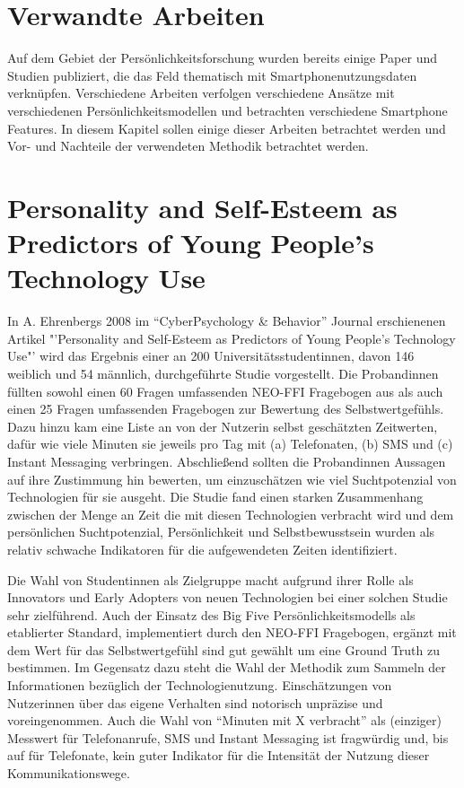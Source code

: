 \section{Verwandte Arbeiten}
\label{ch:Grundlagen:sec:RelatedWork}

Auf dem Gebiet der Persönlichkeitsforschung wurden bereits einige Paper und Studien publiziert,
die das Feld thematisch mit Smartphonenutzungsdaten verknüpfen. 
Verschiedene Arbeiten verfolgen verschiedene Ansätze mit verschiedenen Persönlichkeitsmodellen und betrachten verschiedene Smartphone Features.
In diesem Kapitel sollen einige dieser Arbeiten betrachtet werden und Vor- und Nachteile der verwendeten Methodik betrachtet werden.

\section*{Personality and Self-Esteem as Predictors of Young People’s Technology Use}

In A. Ehrenbergs 2008 im "`CyberPsychology \& Behavior"' Journal erschienenen Artikel "'Personality and Self-Esteem as Predictors of Young People’s Technology Use"' \cite{ehrenberg2008personality}
wird das Ergebnis einer an 200 Universitätsstudentinnen, davon 146 weiblich und 54  männlich, durchgeführte Studie vorgestellt.
Die Probandinnen füllten sowohl einen 60 Fragen umfassenden NEO-FFI Fragebogen aus als auch einen 25 Fragen umfassenden Fragebogen zur Bewertung des Selbstwertgefühls.
Dazu hinzu kam eine Liste an von der Nutzerin selbst geschätzten Zeitwerten, dafür wie viele Minuten sie jeweils pro Tag mit (a) Telefonaten, (b) SMS und (c) Instant Messaging verbringen.
Abschließend sollten die Probandinnen Aussagen auf ihre Zustimmung hin bewerten, um einzuschätzen wie viel Suchtpotenzial von Technologien für sie ausgeht.
Die Studie fand einen starken Zusammenhang zwischen der Menge an Zeit die mit diesen Technologien verbracht wird und dem persönlichen Suchtpotenzial, Persönlichkeit und Selbstbewusstsein wurden als relativ schwache Indikatoren für die aufgewendeten Zeiten identifiziert.
\par
Die Wahl von Studentinnen als Zielgruppe macht aufgrund ihrer Rolle als Innovators und Early Adopters von neuen Technologien bei einer solchen Studie sehr zielführend.
Auch der Einsatz des Big Five Persönlichkeitsmodells als etablierter Standard, implementiert durch den NEO-FFI Fragebogen, ergänzt mit dem Wert für das Selbstwertgefühl sind gut gewählt um eine Ground Truth zu bestimmen.
Im Gegensatz dazu steht die Wahl der Methodik zum Sammeln der Informationen bezüglich der Technologienutzung.
Einschätzungen von Nutzerinnen über das eigene Verhalten sind notorisch unpräzise und voreingenommen.
Auch die Wahl von "`Minuten mit X verbracht"' als (einziger) Messwert für Telefonanrufe, SMS und Instant Messaging ist fragwürdig und, bis auf für Telefonate, kein guter Indikator für die Intensität der Nutzung dieser Kommunikationswege.


